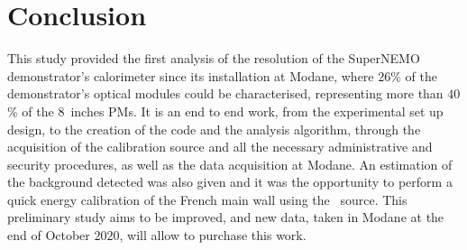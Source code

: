 \section{Conclusion}


This study provided the first analysis of the resolution of the SuperNEMO demonstrator's calorimeter since its installation at Modane, where $26$\% of the demonstrator's optical modules could be characterised, representing more than $40$\% of the $8$~inches PMs.
It is an end to end work, from the experimental set up design, to the creation of the code and the analysis algorithm, through the acquisition of the calibration source and all the necessary administrative and security procedures, as well as the data acquisition at Modane.
An estimation of the background detected was also given and it was the opportunity to perform a quick energy calibration of the French main wall using the \Co\ source.
This preliminary study aims to be improved, and new data, taken in Modane at the end of October $2020$, will allow to purchase this work.






